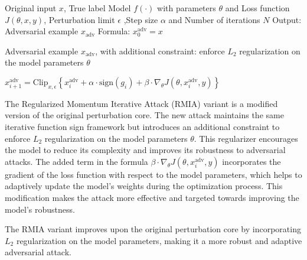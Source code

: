 Original input $x$, True label Model $f(\cdot)$ with parameters $\theta$
and Loss function $J(\theta, x, y)$, Perturbation limit $\epsilon$ ,Step size $\alpha$ and Number of iterations $N$
Output: Adversarial example $x_{\text{adv}}$
Formula: $x_{0}^{\text{adv}} = x$

Adversarial example $x_{\text{adv}}$, with additional constraint: enforce $L_2$ regularization on the model parameters $\theta$

$x_{i+1}^{\text{adv}} = \text{Clip}_{x, \epsilon}\left\{ x_i^{\text{adv}} + \alpha \cdot \text{sign}(g_i) + \beta \cdot \nabla_\theta J(\theta, x_i^{\text{adv}}, y) \right\}$

The Regularized Momentum Iterative Attack (RMIA) variant is a modified version of the original perturbation core. The new attack maintains the same iterative function sign framework but introduces an additional constraint to enforce $L_2$ regularization on the model parameters $\theta$. This regularizer encourages the model to reduce its complexity and improves its robustness to adversarial attacks. The added term in the formula $\beta \cdot \nabla_\theta J(\theta, x_i^{\text{adv}}, y)$ incorporates the gradient of the loss function with respect to the model parameters, which helps to adaptively update the model's weights during the optimization process. This modification makes the attack more effective and targeted towards improving the model's robustness.

The RMIA variant improves upon the original perturbation core by incorporating $L_2$ regularization on the model parameters, making it a more robust and adaptive adversarial attack.